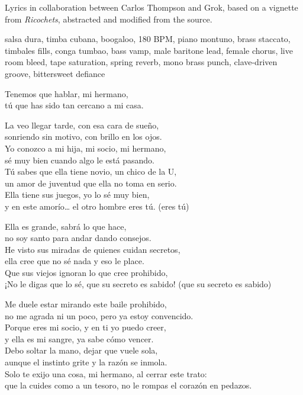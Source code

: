 
\label{sec:secreto-de-padre}
\begin{notes}
Lyrics in collaboration between Carlos Thompson and Grok, based on a vignette from \emph{Ricochets}, abstracted and modified from the source.
\end{notes}
\begin{style}
salsa dura, timba cubana, boogaloo, 180 BPM, piano montuno, brass staccato, timbales fills, conga tumbao, bass vamp, male baritone lead, female chorus, live room bleed, tape saturation, spring reverb, mono brass punch, clave-driven groove, bittersweet defiance
\end{style}
\begin{lyrics}
Tenemos que hablar, mi hermano,\\
tú que has sido tan cercano a mi casa.

La veo llegar tarde, con esa cara de sueño,\\
sonriendo sin motivo, con brillo en los ojos.\\
Yo conozco a mi hija, mi socio, mi hermano,\\
sé muy bien cuando algo le está pasando.\\
Tú sabes que ella tiene novio, un chico de la U,\\
un amor de juventud que ella no toma en serio.\\
Ella tiene sus juegos, yo lo sé muy bien,\\
y en este amorío… el otro hombre eres tú.
(eres tú)


Ella es grande, sabrá lo que hace,\\
no soy santo para andar dando consejos.\\
He visto sus miradas de quienes cuidan secretos,\\
ella cree que no sé nada y eso le place.\\
Que sus viejos ignoran lo que cree prohibido,\\
¡No le digas que lo sé, que su secreto es sabido!
(que su secreto es sabido)

Me duele estar mirando este baile prohibido,\\
no me agrada ni un poco, pero ya estoy convencido.\\
Porque eres mi socio, y en ti yo puedo creer,\\
y ella es mi sangre, ya sabe cómo vencer.\\
Debo soltar la mano, dejar que vuele sola,\\
aunque el instinto grite y la razón se inmola.\\
Solo te exijo una cosa, mi hermano, al cerrar este trato:\\
que la cuides como a un tesoro, no le rompas el corazón en pedazos.


\end{lyrics}
